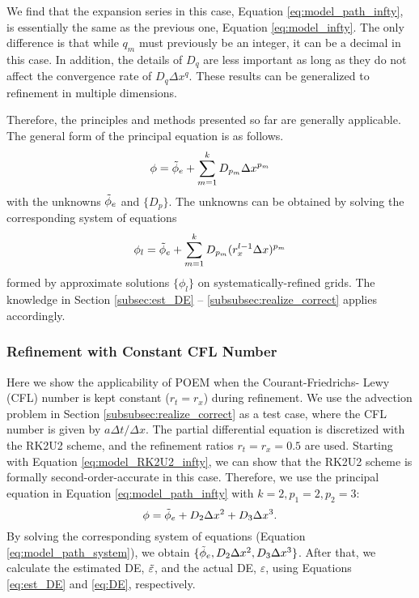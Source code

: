 We find that the expansion series in this case, Equation \ref{eq:model_path_infty}, is essentially the same as the previous one, Equation \ref{eq:model_infty}. The only difference is that while $q_m$ must previously be an integer, it can be a decimal in this case. In addition, the details of $D_q$ are less important as long as they do not affect the convergence rate of $D_q \Delta x^q$. These results can be generalized to refinement in multiple dimensions.

Therefore, the principles and methods presented so far are generally applicable. The general form of the principal equation is as follows.
\begin{equation} \label{eq:model_path}
    \phi = \Tilde{\phi}_{e} + \sum_{m=1}^{k} D_{p_m} \Delta x^{p_m}
\end{equation}
with the unknowns $\Tilde{\phi}_{e}$ and $\{D_p\}$. The unknowns can be obtained by solving the corresponding system of equations
\begin{align} \label{eq:model_path_system}
    \phi_l = \Tilde{\phi}_{e} + \sum_{m=1}^{k} D_{p_m} (r_x^{l-1} \Delta x)^{p_m}
\end{align}
formed by approximate solutions $\{\phi_l\}$ on systematically-refined grids. The knowledge in Section \ref{subsec:est_DE} -- \ref{subsubsec:realize_correct} applies accordingly.


\subsubsection{Refinement with Constant CFL Number} \label{subsubsec:const_cfl}
Here we show the applicability of POEM when the Courant-Friedrichs-
Lewy (CFL) number \citep{CFL1928} is kept constant ($r_t = r_x$) during refinement. We use the advection problem in Section \ref{subsubsec:realize_correct} as a test case, where the CFL number is given by $a \Delta t / \Delta x$. The partial differential equation is discretized with the RK2U2 scheme, and the refinement ratios $r_t = r_x = 0.5$ are used. Starting with Equation \ref{eq:model_RK2U2_infty}, we can show that the RK2U2 scheme is formally second-order-accurate in this case. Therefore, we use the principal equation in Equation \ref{eq:model_path_infty} with $k = 2, p_1 = 2, p_2 = 3$:
\begin{equation} \label{eq:model_path_k2}
    \phi = \Tilde{\phi}_{e} + D_{2}\Delta x^{2} + D_{3}\Delta x^{3}.
\end{equation}
By solving the corresponding system of equations (Equation \ref{eq:model_path_system}), we obtain $\{\Tilde{\phi}_{e}, D_{2}\Delta x^{2}, D_{3}\Delta x^{3}\}$. After that, we calculate the estimated DE, $\Tilde{\varepsilon}$, and the actual DE, $\varepsilon$, using Equations \ref{eq:est_DE} and \ref{eq:DE}, respectively.

